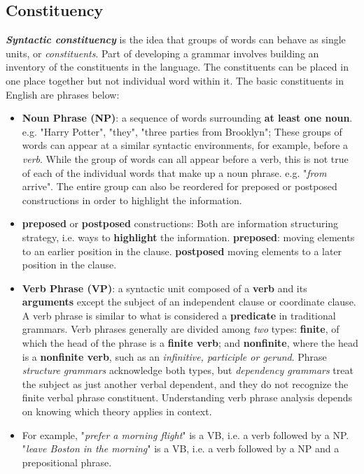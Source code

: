 \documentclass[11pt]{article}
\begin{document}
\subsection{Constituency}
\textbf{\emph{Syntactic constituency}} is the idea that groups of words can behave as single units, or \emph{constituents}. Part of developing a grammar involves building an inventory of the constituents in the language. The constituents can be placed in one place together but not individual word within it.  The basic constituents in English are phrases below:
\begin{itemize}
\item \textbf{Noun Phrase (NP)}: a sequence of words surrounding \textbf{at least one noun}. e.g. "Harry Potter", "they", "three parties from Brooklyn"; These groups of words can appear at a similar syntactic environments, for example, before a \emph{verb}. While the group of words can all appear before a verb, this is not true of each of the individual words that make up a noun phrase.  e.g. "\emph{from} arrive". The entire group can also be reordered for preposed or postposed constructions in order to highlight the information. 
\item \textbf{preposed} or \textbf{postposed} constructions: Both are information structuring strategy, i.e. ways to \textbf{highlight} the information.   \textbf{preposed}: moving elements to an earlier position in the clause. \textbf{postposed} moving elements to a later position in the clause.
\item \textbf{Verb Phrase (VP)}: a syntactic unit composed of a \textbf{verb} and its \textbf{arguments} except the subject of an independent clause or coordinate clause.  A verb phrase is similar to what is considered a \textbf{predicate} in traditional grammars. Verb phrases generally are divided among \emph{two} types: \textbf{finite}, of which the head of the phrase is a \textbf{finite verb}; and \textbf{nonfinite}, where the head is a \textbf{nonfinite verb}, such as an \emph{infinitive, participle or gerund}. Phrase \emph{structure grammars} acknowledge both types, but \emph{dependency grammars} treat the subject as just another verbal dependent, and they do not recognize the finite verbal phrase constituent. Understanding verb phrase analysis depends on knowing which theory applies in context. 
\item For example, "\emph{prefer a morning flight}" is a VB, i.e. a verb followed by a NP. "\emph{leave Boston in the morning}" is a VB, i.e. a verb followed by a NP and a prepositional phrase.

\end{itemize}
\end{document}
